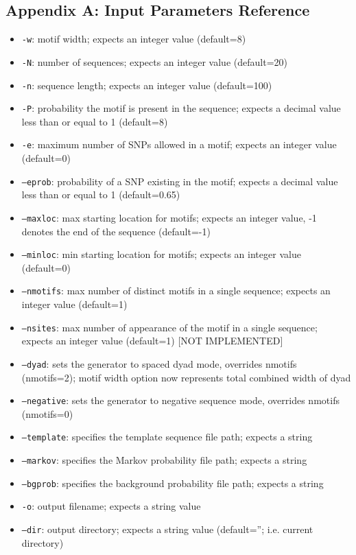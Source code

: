 \documentclass[12pt]{article}
\begin{document}
\subsection*{Appendix A: Input Parameters Reference}
\begin{itemize}
	\item \texttt{-w}: motif width; expects an integer value (default=8)
	\item \texttt{-N}: number of sequences; expects an integer value (default=20)
	\item \texttt{-n}: sequence length; expects an integer value (default=100)
	\item \texttt{-P}: probability the motif is present in the sequence; expects a decimal value less than or equal to 1 (default=8)
	\item \texttt{-e}: maximum number of SNPs allowed in a motif; expects an integer value (default=0)
	\item \texttt{--eprob}: probability of a SNP existing in the motif; expects a decimal value less than or equal to 1 (default=0.65)
	\item \texttt{--maxloc}: max starting location for motifs; expects an integer value, -1 denotes the end of the sequence (default=-1)
	\item \texttt{--minloc}: min starting location for motifs; expects an integer value (default=0)
	\item \texttt{--nmotifs}: max number of distinct motifs in a single sequence; expects an integer value (default=1)
	\item \texttt{--nsites}: max number of appearance of the motif in a single sequence; expects an integer value (default=1) [NOT IMPLEMENTED]
	
	\item \texttt{--dyad}: sets the generator to spaced dyad mode, overrides nmotifs (nmotifs=2); motif width option now represents total combined width of dyad
	\item \texttt{--negative}: sets the generator to negative sequence mode, overrides nmotifs (nmotifs=0)
	
	\item \texttt{--template}: specifies the template sequence file path; expects a string
	\item \texttt{--markov}: specifies the Markov probability file path; expects a string
	\item \texttt{--bgprob}: specifies the background probability file path; expects a string
	
	\item \texttt{-o}: output filename; expects a string value
	\item \texttt{--dir}: output directory; expects a string value (default=''; i.e. current directory)
\end{itemize}
\end{document}

